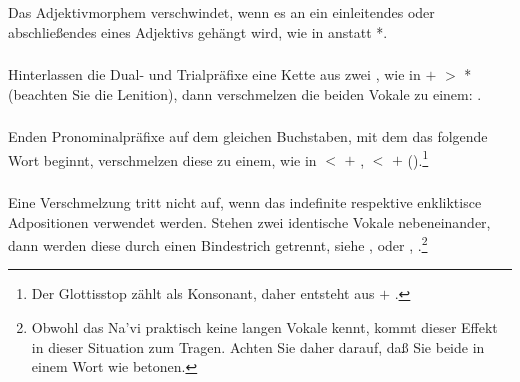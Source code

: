 \subsubsection{} Das Adjektivmorphem  verschwindet, wenn es an
ein einleitendes oder abschlie\ss{}endes  eines Adjektivs geh\"angt wird,
wie in  anstatt *.

\subsubsection{} Hinterlassen die Dual- und Trialpr\"afixe eine Kette aus zwei
, wie in  $+$  $>$ * (beachten Sie die Lenition),
dann verschmelzen die beiden Vokale zu einem: .
\label{l-and-s:phonotactics:nsc} 

\subsubsection{} Enden Pronominalpr\"afixe auf dem gleichen Buchstaben,
mit dem das folgende Wort beginnt, verschmelzen diese zu einem, wie
in  $<$  $+$ ,  $<$  $+$ 
().\footnote{Der Glottisstop z\"ahlt
als Konsonant, daher entsteht  aus  $+$ .}
\label{l-and-s:phonotactics:precontract}

\subsubsection{} Eine Verschmelzung tritt nicht auf, wenn das indefinite 
respektive enkliktisce Adpositionen verwendet werden. Stehen zwei identische Vokale
nebeneinander, dann werden diese durch einen Bindestrich getrennt, siehe ,
 oder , .\footnote{
Obwohl das Na’vi praktisch keine langen Vokale kennt, kommt dieser Effekt in
dieser Situation zum Tragen. Achten Sie daher darauf, da\ss{} Sie beide 
in einem Wort wie  betonen.}

